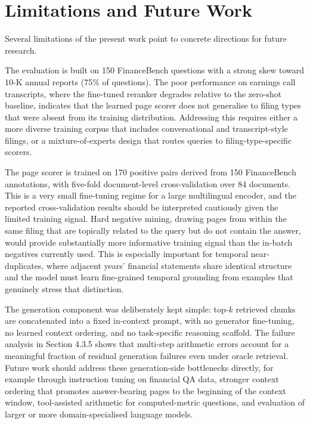\documentclass[12pt,twoside,maitrise]{dms}
\newcounter{example}
\theoremstyle{definition}
\numberwithin{equation}{section}
\numberwithin{table}{chapter}
\numberwithin{figure}{chapter}
\begin{document}
\section{Limitations and Future Work}

Several limitations of the present work point to concrete directions for future research.

The evaluation is built on 150 FinanceBench questions with a strong skew toward 10-K
annual reports (75\% of questions). The poor performance on earnings call transcripts, where
the fine-tuned reranker degrades relative to the zero-shot baseline, indicates that the learned
page scorer does not generalise to filing types that were absent from its training distribution.
Addressing this requires either a more diverse training corpus that includes conversational
and transcript-style filings, or a mixture-of-experts design that routes queries to filing-type-specific scorers.

The page scorer is trained on 170 positive pairs derived from 150 FinanceBench
annotations, with five-fold document-level cross-validation over 84 documents. This is a
very small fine-tuning regime for a large multilingual encoder, and the reported
cross-validation results should be interpreted cautiously given the limited training signal.
Hard negative mining, drawing pages from within the same filing that are topically related
to the query but do not contain the answer, would provide substantially more informative
training signal than the in-batch negatives currently used. This is especially important for
temporal near-duplicates, where adjacent years' financial statements share identical
structure and the model must learn fine-grained temporal grounding from examples that
genuinely stress that distinction.

The generation component was deliberately kept simple: top-$k$ retrieved chunks are
concatenated into a fixed in-context prompt, with no generator fine-tuning, no learned
context ordering, and no task-specific reasoning scaffold. The failure analysis in Section 4.3.5
shows that multi-step arithmetic errors account for a meaningful fraction of residual
generation failures even under oracle retrieval. Future work should address these
generation-side bottlenecks directly, for example through instruction tuning on financial QA
data, stronger context ordering that promotes answer-bearing pages to the beginning of the
context window, tool-assisted arithmetic for computed-metric questions, and evaluation of
larger or more domain-specialised language models.
\end{document}
